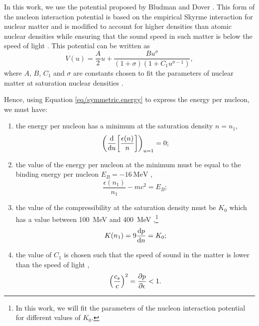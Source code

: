 \documentclass[draft,11pt]{article}
\theoremstyle{definition}
\theoremstyle{remark}
\begin{document}
                In this work, we use the potential proposed by Bludman and Dover \cite{bludman.dover.1980/extrapolation.skyrme.eos}. This form of the nucleon interaction potential is based on the empirical Skyrme interaction for nuclear matter and is modified to account for higher densities than atomic nuclear densities while ensuring that the sound speed in such matter is below the speed of light \cite{bludman.dover.1980/extrapolation.skyrme.eos}. This potential can be written as \parencite{silbar.reddy.2004/neutron.stars} \begin{equation}\label{eq/symmetric.potential}V(u)=\frac{A}{2}u+\frac{Bu^{\sigma}}{(1+\sigma)(1+C_{1}u^{\sigma-1})},\end{equation} where $A$, $B$, $C_{1}$ and $\sigma$ are constants chosen to fit the parameters of nuclear matter at saturation nuclear densities \parencite{bludman.dover.1980/extrapolation.skyrme.eos}.
                
                Hence, using Equation \ref{eq/symmetric.energy} to express the energy per nucleon, we must have:
                \begin{enumerate}
                    \item the energy per nucleon has a minimum at the saturation density $n=n_{1}$, \begin{equation}\label{eq/symmetric.energy/saturation.minimum}\qty(\dv{u}\qty[\frac{\epsilon(n)}{n}])_{u=1}=0;\end{equation}
                    \item the value of the energy per nucleon at the minimum must be equal to the binding energy per nucleon $E_{B}=-\SI{16}{\mega\electronvolt}$ \parencite{silbar.reddy.2004/neutron.stars}, \begin{equation}\label{eq/symmetric.energy/binding.energy}\frac{\epsilon(n_{1})}{n_{1}}-mc^{2}=E_{B};\end{equation}
                    \item the value of the compressibility at the saturation density must be $K_{0}$ which has a value between \SI{100}{\mega\electronvolt} and \SI{400}{\mega\electronvolt} \parencite{silbar.reddy.2004/neutron.stars,prakash.ainsworth.lattimer.1988/eos},\footnote{In this work, we will fit the parameters of the nucleon interaction potential for different values of $K_{0}$.} \begin{equation}\label{eq/symmetric.energy/compressibility}K(n_{1})=9\dv{p}{n}=K_{0};\end{equation}
                    \item the value of $C_{1}$ is chosen such that the speed of sound in the matter is lower than the speed of light \parencite{bludman.dover.1980/extrapolation.skyrme.eos}, \begin{equation}\label{eq/symmetric.energy/speed.of.sound}\qty(\frac{c_{s}}{c})^{2}=\pdv{p}{\epsilon}<1.\end{equation}
                \end{enumerate}
\end{document}
